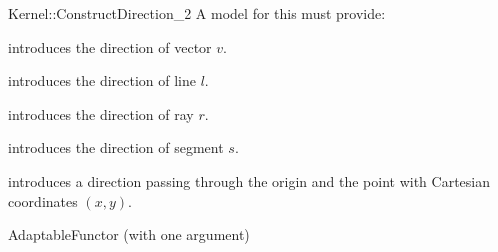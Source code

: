 \begin{ccRefFunctionObjectConcept}{Kernel::ConstructDirection_2}
A model for this must provide:


            {introduces the direction of vector $v$.}

            {introduces the direction of line $l$.}

            {introduces the direction of ray $r$.}

            {introduces the direction of segment $s$.}

\ccHidden{}
            {introduces a direction  passing through the origin
             and the point with Cartesian coordinates $(x, y)$.}

\ccRefines
AdaptableFunctor (with one argument)

\ccSeeAlso

  \\

\end{ccRefFunctionObjectConcept}
